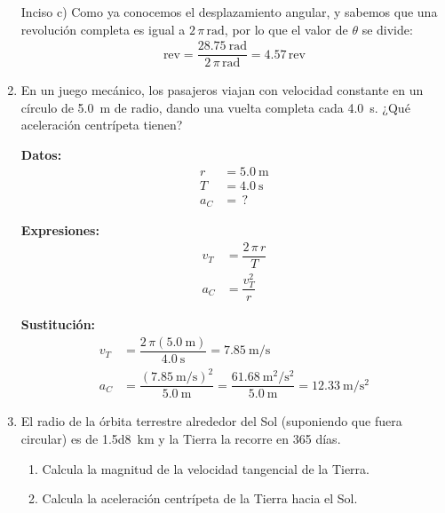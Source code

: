 \documentclass[14pt]{extarticle}
\begin{document}
\begin{enumerate}
Inciso c) Como ya conocemos el desplazamiento angular, y sabemos que una revolución completa es igual a $2 \, \pi \, \unit{\radian}$, por lo que el valor de $\theta$ se divide:
\begin{align*}
\text{rev} = \dfrac{\SI{28.75}{\radian}}{2 \, \pi \, \unit{\radian}} = 4.57 \, \text{rev}
\end{align*}
\item En un juego mecánico, los pasajeros viajan con velocidad constante en un círculo de \SI{5.0}{\meter} de radio, dando una vuelta completa cada \SI{4.0}{\second}. ¿Qué aceleración centrípeta tienen?

\begin{minipage}[t]{0.4\linewidth}
\textbf{Datos:}
\begin{align*}
r &= \SI{5.0}{\meter} \\
T &= \SI{4.0}{\second} \\
a_{C} &= \, ?
\end{align*}
\end{minipage}
\begin{minipage}[t]{0.4\linewidth}
\textbf{Expresiones:}
\begin{align*}
v_{T} &= \dfrac{2 \, \pi \, r}{T} \\[0.5em]
a_{C} &= \dfrac{v_{T}^{2}}{r}
\end{align*}
\end{minipage}

\textbf{Sustitución:}
\begin{align*}
v_{T} &= \dfrac{2 \, \pi \left( \SI{5.0}{\meter} \right)}{\SI{4.0}{\second}} = \SI[per-mode=fraction]{7.85}{\meter\per\second} \\[0.5em]
a_{C} &= \dfrac{\left( \displaystyle \SI[per-mode=fraction]{7.85}{\meter\per\second} \right)^{2}}{\SI{5.0}{\meter}} = \dfrac{\displaystyle \SI[per-mode=fraction]{61.68}{\square\meter\per\square\second}}{\SI{5.0}{\meter}} = \SI[per-mode=fraction]{12.33}{\meter\per\square\second}
\end{align*}
\item El radio de la órbita terrestre alrededor del Sol (suponiendo que fuera circular) es de \SI{1.5d8}{\kilo\meter} y la Tierra la recorre en \num{365} días.
\begin{enumerate}[label=\alph*)]
\item Calcula la magnitud de la velocidad tangencial de la Tierra.
\item Calcula la aceleración centrípeta de la Tierra hacia el Sol.
\end{enumerate}


\end{enumerate}
\end{document}
